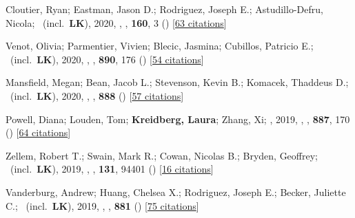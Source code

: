 \item[{\color{numcolor}\scriptsize35}] Cloutier, Ryan; Eastman, Jason D.; Rodriguez, Joseph E.; Astudillo-Defru, Nicola; \etal\ (incl.\ \textbf{LK}), 2020, , \aj, \textbf{160}, 3 () [\href{https://ui.adsabs.harvard.edu/abs/2020AJ....160....3C}{63 citations}]

\item[{\color{numcolor}\scriptsize34}] Venot, Olivia; Parmentier, Vivien; Blecic, Jasmina; Cubillos, Patricio E.; \etal\ (incl.\ \textbf{LK}), 2020, , \apj, \textbf{890}, 176 () [\href{https://ui.adsabs.harvard.edu/abs/2020ApJ...890..176V}{54 citations}]

\item[{\color{numcolor}\scriptsize33}] Mansfield, Megan; Bean, Jacob L.; Stevenson, Kevin B.; Komacek, Thaddeus D.; \etal\ (incl.\ \textbf{LK}), 2020, , \apj, \textbf{888} () [\href{https://ui.adsabs.harvard.edu/abs/2020ApJ...888L..15M}{57 citations}]

\item[{\color{numcolor}\scriptsize32}] Powell, Diana; Louden, Tom; \textbf{Kreidberg, Laura}; Zhang, Xi; \etal, 2019, , \apj, \textbf{887}, 170 () [\href{https://ui.adsabs.harvard.edu/abs/2019ApJ...887..170P}{64 citations}]

\item[{\color{numcolor}\scriptsize31}] Zellem, Robert T.; Swain, Mark R.; Cowan, Nicolas B.; Bryden, Geoffrey; \etal\ (incl.\ \textbf{LK}), 2019, , \pasp, \textbf{131}, 94401 () [\href{https://ui.adsabs.harvard.edu/abs/2019PASP..131i4401Z}{16 citations}]

\item[{\color{numcolor}\scriptsize30}] Vanderburg, Andrew; Huang, Chelsea X.; Rodriguez, Joseph E.; Becker, Juliette C.; \etal\ (incl.\ \textbf{LK}), 2019, , \apj, \textbf{881} () [\href{https://ui.adsabs.harvard.edu/abs/2019ApJ...881L..19V}{75 citations}]

